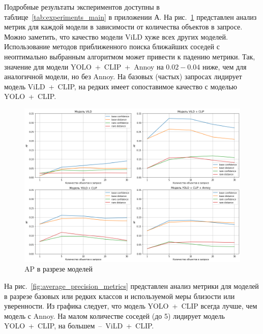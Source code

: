 \documentclass[a4paper,14pt]{article}
\begin{document}

    Подробные результаты экспериментов доступны в таблице~\ref{tab:experiments_main} в приложении А.
    На рис.~\ref{fig:average_precision_dataset} представлен анализ метрик для каждой модели в зависимости от количества объектов в запросе.
    Можно заметить, что качество модели ViLD хуже всех других моделей.
    Использование методов приближенного поиска ближайших соседей с неоптимально выбранным алгоритмом может привести к падению метрики.
    Так, значение для модели YOLO~+~CLIP~+~Annoy на $0.02 - 0.04$ ниже, чем для аналогичной модели, но без Annoy.
    На базовых (частых) запросах лидирует модель ViLD~+~CLIP, на редких имеет сопоставимое качество с моделью YOLO~+~CLIP.

    \begin{figure}[H]
        \centering
        \includegraphics[width=0.999\linewidth]{images/average_precision_dataset}
        \caption{AP в разрезе моделей}
        \label{fig:average_precision_dataset}
    \end{figure}

    На рис.~\ref{fig:average_precision_metrics} представлен анализ метрики для моделей в разрезе базовых или редких классов и используемой меры близости или уверенности.
    Из графика следует, что модель YOLO~+~CLIP всегда лучше, чем модель с Annoy.
    На малом количестве соседей (до 5) лидирует модель YOLO~+~CLIP, на большем~--~ViLD~+~CLIP.
\end{document}
